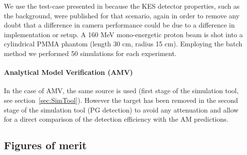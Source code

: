 \documentclass[a4paper,english,12pt]{article}
\begin{document}
We use the test-case presented in \cite{Perali2014} because the KES detector properties, such as the background, were published for that scenario, again in order to remove any doubt that a difference in camera performance could be due to a difference in implementation or setup. A 160 MeV mono-energetic proton beam is shot into a cylindrical PMMA phantom (length 30 cm, radius 15 cm). Employing the batch method we performed 50 simulations for each experiment.

\paragraph{Analytical Model Verification (AMV)}

In the case of AMV, the same source is used (first stage of the simulation tool, see section~\ref{sec:SimTool}). However the target has been removed in the second stage of the simulation tool (PG detection) to avoid any attenuation and allow for a direct comparison of the detection efficiency with the AM predictions.


\subsection{Figures of merit}\label{figmerit}



\end{document}
